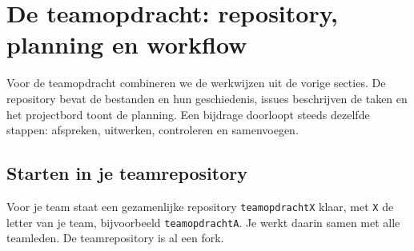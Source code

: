 \documentclass[kulak]{kulakarticle} %
\begin{document}

\section{De teamopdracht: repository, planning en workflow}
\label{sec:teamopdracht}

Voor de teamopdracht combineren we de werkwijzen uit de vorige secties.
De repository bevat de bestanden en hun geschiedenis, issues beschrijven
de taken en het projectbord toont de planning. Een bijdrage doorloopt steeds
dezelfde stappen: afspreken, uitwerken, controleren en samenvoegen.

\subsection{Starten in je teamrepository}

Voor je team staat een gezamenlijke repository \texttt{teamopdrachtX}
klaar, met \texttt{X} de letter van je team, bijvoorbeeld
\texttt{teamopdrachtA}. Je werkt daarin samen met alle teamleden. De
teamrepository is al een fork.
\end{document}

